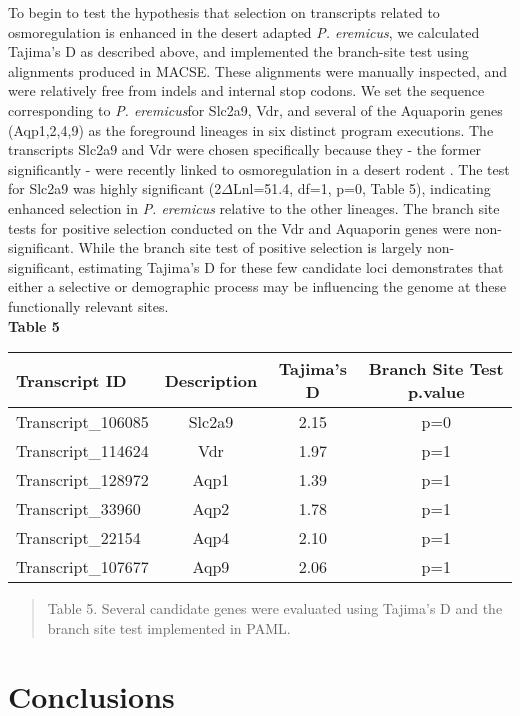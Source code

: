\documentclass[12pt]{article}
\newcommand{\peer}{\textit{P. eremicus}}
\begin{document}
To begin to test the hypothesis that selection on transcripts related to osmoregulation is enhanced in the desert adapted \peer, we calculated Tajima's D as described above, and implemented the branch-site test using alignments produced in MACSE. These alignments were manually inspected, and were relatively free from indels and internal stop codons. We set the sequence corresponding to \peer\:for Slc2a9, Vdr, and several of the Aquaporin genes (Aqp1,2,4,9) as the foreground lineages in six distinct program executions. The transcripts Slc2a9 and Vdr were chosen specifically because they - the former significantly - were recently linked to osmoregulation in a desert rodent \citep{Marra:2014de}. The test for Slc2a9 was highly significant (2$\Delta$Lnl=51.4, df=1, p=0, Table 5), indicating enhanced selection in \peer\: relative to the other lineages. The branch site tests for positive selection conducted on the Vdr and Aquaporin genes were non-significant. While the branch site test of positive selection is largely non-significant, estimating Tajima's D for these few candidate loci demonstrates that either a selective or demographic process may be influencing the genome at these functionally relevant sites.  \\


\textbf{\hypertarget{Table 5}{Table 5}} \\
\begin{center}
\begin{tabular}{ l c c c }
\textbf{Transcript ID} & \textbf{Description} & \textbf{Tajima's D} & \textbf{Branch Site Test p.value} \\
\hline
Transcript\_106085 & Slc2a9 & 2.15 & p=0\\
Transcript\_114624 & Vdr & 1.97 & p=1 \\
Transcript\_128972 & Aqp1 & 1.39 & p=1 \\
Transcript\_33960 & Aqp2 & 1.78 & p=1 \\
Transcript\_22154 & Aqp4 & 2.10 & p=1 \\
Transcript\_107677 & Aqp9 & 2.06 & p=1 \\

 \end{tabular}
\begin{quote}
\small{Table 5. Several candidate genes were evaluated using Tajima's D and the branch site test implemented in PAML. }
\end{quote}  
\end{center}

\section*{Conclusions}
\end{document}
